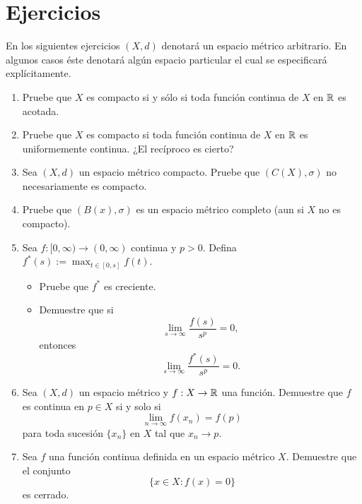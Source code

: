 \section{Ejercicios}

En los siguientes ejercicios $(X, d)$ denotará un espacio métrico arbitrario. En algunos casos éste denotará algún espacio particular el cual se especificará explícitamente.

\begin{enumerate}
    \item Pruebe que $X$ es compacto si y sólo si toda función continua de $X$ en $\mathbb{R}$ es acotada.
    
    \item Pruebe que $X$ es compacto si toda función continua de $X$ en $\mathbb{R}$ es uniformemente continua. ¿El recíproco es cierto?
    
    \item Sea $(X, d)$ un espacio métrico compacto. Pruebe que $(C(X), \sigma)$ no necesariamente es compacto.
    
    \item Pruebe que $(B(x), \sigma)$ es un espacio métrico completo (aun si $X$ no es compacto).
    
    \item Sea $f : [0, \infty) \to (0, \infty)$ continua y $p > 0$. Defina $f^*(s) := \max_{t \in [0,s]} f(t)$.
    \begin{itemize}
        \item Pruebe que $f^*$ es creciente.
        \item Demuestre que si
        \begin{equation}
            \lim_{s \to \infty} \frac{f(s)}{s^p} = 0,
        \end{equation}
        entonces
        \begin{equation}
            \lim_{s \to \infty} \frac{f^*(s)}{s^p} = 0.
        \end{equation}
    \end{itemize}
    
    \item Sea $(X, d)$ un espacio métrico y $f : X \to \mathbb{R}$ una función. Demuestre que $f$ es continua en $p \in X$ si y solo si
    \[ \lim_{n \to \infty} f(x_n) = f(p) \]
    para toda sucesión $\{x_n\}$ en $X$ tal que $x_n \to p$.
    
    \item Sea $f$ una función continua definida en un espacio métrico $X$. Demuestre que el conjunto
    \[ \{x \in X : f(x) = 0\} \]
    es cerrado.
    

\end{enumerate}

